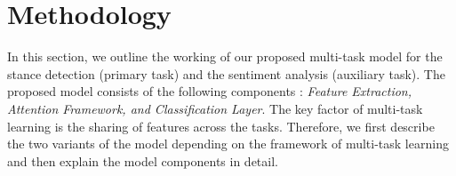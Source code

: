 \documentclass[letterpaper]{article} %
\begin{document}

\section{Methodology}\label{Methodology}
In this section, we outline the working of our proposed multi-task model for the stance detection (primary task) and the sentiment analysis (auxiliary task). The proposed model consists of the following  components : \textit{Feature Extraction, Attention Framework, and Classification Layer}. %
The key factor of multi-task learning is the sharing of features across the tasks. Therefore, we first describe the two variants of the model depending on the framework of multi-task learning and then explain the model components in detail.
\end{document}
